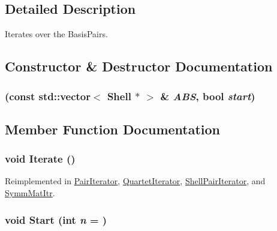 \subsection{Detailed Description}
Iterates over the BasisPairs. 

\subsection{Constructor \& Destructor Documentation}
\hypertarget{classJKBuilder_1_1BasisQuartetIterator_afac9e1e5415c1d0b7359faa353f6b86d}{
\subsubsection[{BasisQuartetIterator}]{ (const std::vector$<$ {\bf Shell} $\ast$ $>$ \& {\em ABS}, \/  bool {\em start})}}
\label{classJKBuilder_1_1BasisQuartetIterator_afac9e1e5415c1d0b7359faa353f6b86d}


\subsection{Member Function Documentation}
\hypertarget{classJKBuilder_1_1Iterator_a7874a07e98b52f4f147cde6f39353bae}{
\subsubsection[{Iterate}]{\setlength{\rightskip}{0pt plus 5cm}void Iterate ()}}
\label{classJKBuilder_1_1Iterator_a7874a07e98b52f4f147cde6f39353bae}


Reimplemented in \hyperlink{classJKBuilder_1_1PairIterator_a7874a07e98b52f4f147cde6f39353bae}{PairIterator}, \hyperlink{classJKBuilder_1_1QuartetIterator_a7874a07e98b52f4f147cde6f39353bae}{QuartetIterator}, \hyperlink{classJKBuilder_1_1ShellPairIterator_a7874a07e98b52f4f147cde6f39353bae}{ShellPairIterator}, and \hyperlink{classJKBuilder_1_1SymmMatItr_a7874a07e98b52f4f147cde6f39353bae}{SymmMatItr}.\hypertarget{classJKBuilder_1_1Iterator_a34ca36a99b20ae3170babadaffe51ed2}{
\subsubsection[{Start}]{\setlength{\rightskip}{0pt plus 5cm}void Start (int {\em n} = {})}}
\label{classJKBuilder_1_1Iterator_a34ca36a99b20ae3170babadaffe51ed2}


